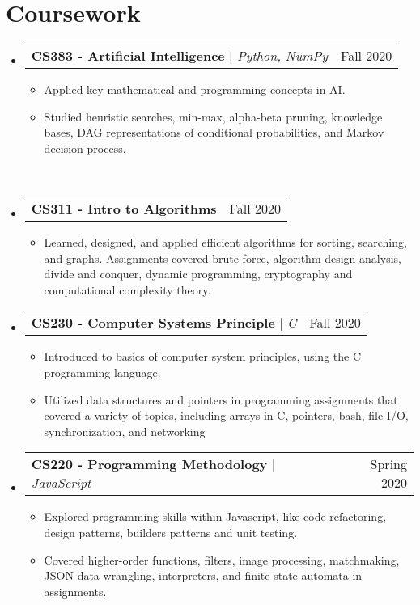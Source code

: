 \documentclass[letterpaper,11pt]{article}
\makeatletter
\newcommand{\resumeItem}[1]{
  \item\small{
    {#1 \vspace{-2pt}}
  }
}
\newcommand{\resumeProjectHeading}[2]{
    \item
    \begin{tabular*}{0.97\textwidth}{l@{\extracolsep{\fill}}r}
      \small#1 & #2 \\
    \end{tabular*}\vspace{-7pt}
}
\newcommand{\resumeSubHeadingListStart}{\begin{itemize}[leftmargin=0in, label={}]}
\newcommand{\resumeSubHeadingListEnd}{\end{itemize}}
\newcommand{\resumeItemListStart}{\begin{itemize}}
\newcommand{\resumeItemListEnd}{\end{itemize}\vspace{-5pt}}
\makeatother
\begin{document}
\section{Coursework}
    \resumeSubHeadingListStart
      \resumeProjectHeading
          {\textbf{CS383 - Artificial Intelligence} $|$ \emph{Python, NumPy}}{Fall 2020}
          \resumeItemListStart
            \resumeItem{Applied key mathematical and programming concepts in AI. }
            \resumeItem{Studied heuristic searches, min-max, alpha-beta pruning, knowledge bases, DAG representations of conditional probabilities, and Markov decision process.}
          \resumeItemListEnd\
      \resumeProjectHeading
          {\textbf{CS311 - Intro to Algorithms} \emph{}}{Fall 2020}
          \resumeItemListStart
            \resumeItem{Learned, designed, and applied efficient algorithms for sorting,
searching, and graphs. Assignments covered brute force, algorithm design analysis, divide and
conquer, dynamic programming, cryptography and computational complexity theory.
}
          \resumeItemListEnd
      \resumeProjectHeading
        {\textbf{CS230 - Computer Systems Principle} $|$ \emph{C}}{Fall 2020}
        \resumeItemListStart
            \resumeItem{Introduced to basics of computer system principles, using the
C programming language. }
            \resumeItem{Utilized data structures and pointers in programming assignments that
covered a variety of topics, including arrays in C, pointers, bash, file I/O, synchronization, and networking}
        \resumeItemListEnd
        \resumeProjectHeading
        {\textbf{CS220 - Programming Methodology} $|$ \emph{JavaScript}}{Spring 2020}
        \resumeItemListStart
            \resumeItem{Explored programming skills within Javascript, like code refactoring, design patterns, builders patterns and unit testing. }
            \resumeItem{Covered higher-order functions, filters, image processing, matchmaking, JSON data wrangling, interpreters, and finite state automata in assignments.}
        \resumeItemListEnd
      
      
    \resumeSubHeadingListEnd
\end{document}
